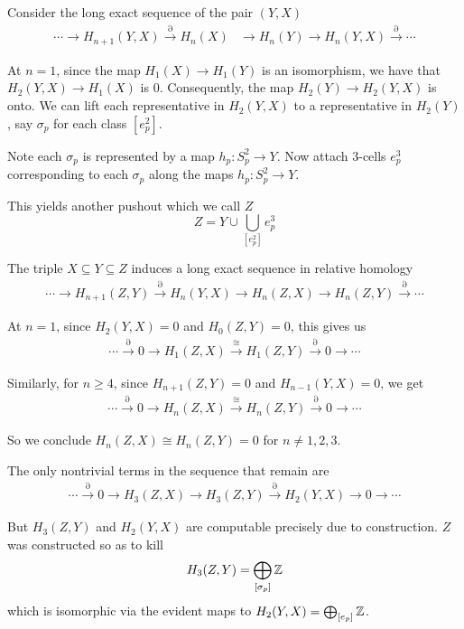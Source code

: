 Consider the long exact sequence of the pair $(Y,X)$
\begin{align*}
  \cdots \to H_{n+1}(Y,X) \xrightarrow{\partial} H_{n}(X) &\to H_n(Y) \to H_n(Y,X) \xrightarrow{\partial} \cdots 
\end{align*}

At $n=1$, since the map $H_1(X) \to H_1(Y)$ is an isomorphism, we have that $H_2(Y,X) \rightarrow{} H_1(X)$ is $0$.
Consequently, the map $H_2(Y) \to H_2(Y,X)$ is onto.
We can lift each representative in $H_2(Y,X)$ to a representative in $H_2(Y)$, say $\sigma_p$ for each class $[e^2_p]$.

Note each $\sigma_p$ is represented by a map $h_p : S^2_p \to Y$.
Now attach $3$-cells $e^3_p$ corresponding to each $\sigma_p$ along the maps $h_p : S^2_p \to Y$.

This yields another pushout which we call $Z$
\[
  Z = Y \cup \bigcup\limits_{[e^2_p]} e^3_p 
  \]

The triple $X \subseteq Y \subseteq Z$ induces a long exact sequence in relative homology
\begin{align*}
  \cdots \to H_{n+1}(Z,Y) \xrightarrow{\partial} H_{n}(Y,X) \to H_{n}(Z,X) \to H_n(Z,Y) \xrightarrow{\partial}\cdots 
\end{align*}

At $n=1$, since $H_2(Y,X) = 0$ and $H_0(Z,Y) = 0$, this gives us
\begin{align*}
  \cdots \xrightarrow{\partial} 0 \to H_{1}(Z,X) \xrightarrow{\cong} H_1(Z,Y)\xrightarrow{\partial} 0 \to  \cdots 
\end{align*}

Similarly, for $n \geq 4$, since $H_{n+1}(Z,Y) = 0$ and $H_{n-1}(Y,X) = 0$, we get
\begin{align*}
  \cdots \xrightarrow{\partial} 0 \to H_{n}(Z,X)\xrightarrow{\cong}H_n(Z,Y) \xrightarrow{\partial} 0 \to \cdots 
\end{align*}

So we conclude $H_n(Z,X) \cong H_n(Z,Y) = 0$ for $n \neq 1,2,3$.

The only nontrivial terms in the sequence that remain are 
\begin{align*}
  \cdots \xrightarrow{\partial} 0 \to H_3(Z,X) \to H_3(Z,Y) \xrightarrow{\partial} H_2(Y,X) \to  0 \to \cdots 
\end{align*}

But $H_3(Z,Y)$ and $H_2(Y,X)$ are computable precisely due to construction.
$Z$ was constructed so as to kill  
\[
H_3(Z,Y) = \bigoplus_{[\sigma_p]} \mathbb{Z}
\]
which is isomorphic via the evident maps to $H_2(Y,X) = \bigoplus_{[e_p]} \mathbb{Z}$.

